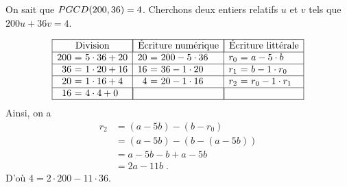             \begin{ex}
                  On sait que $PGCD(200,36) = 4$.
                  Cherchons deux entiers relatifs $u$ et $v$ tels que $200 u + 36 v = 4$.
                  
                  \begin{displaymath}
                        \begin{array}{|r@{\ =\ }l|r@{\ =\ }l|r@{\ =\ }l|}
                              \hline
                              \multicolumn{2}{|c|}{\text{Division}} &
	                                     \multicolumn{2}{|c|}{\text{\'Ecriture num\'erique} } & 
	                                           \multicolumn{2}{|c|}{\text{\'Ecriture litt\'erale} } \\
                              \hline
                              200 & 5 \cdot 36 + 20 & 20 & 200 - 5 \cdot 36       & r_0  & a   - 5 \cdot b    \\
                              \hline
                              36  & 1 \cdot 20 + 16 & 16 & 36  - 1 \cdot 20       & r_1  & b   - 1 \cdot r_0  \\
                              \hline
                              20  & 1 \cdot 16 + 4  & 4  & 20  - 1 \cdot 16       & r_2  & r_0 - 1 \cdot r_1  \\
                              \hline
                              16  & 4 \cdot 4  + 0  & \multicolumn{2}{|c|}{}      & \multicolumn{2}{|c|}{}  \\
                              \hline
                        \end{array}
                  \end{displaymath}
                  Ainsi, on a 
                        \begin{align*}
                              r_2 & = (a-5b) - (b-r_0)       \\
                                  & = (a-5b) - (b-(a-5b))    \\
                                  & = a-5b-b+a-5b            \\
                                  & = 2a - 11 b              \;.
                        \end{align*}
                 D'o\`u $4 = 2 \cdot 200 - 11 \cdot 36$.
            \end{ex}
